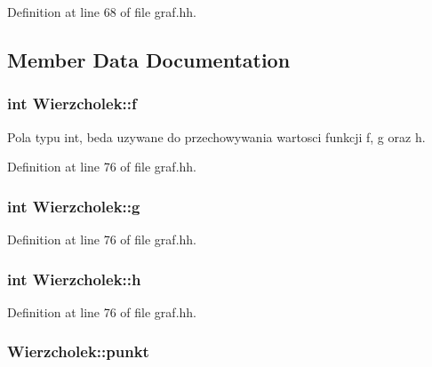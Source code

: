 Definition at line 68 of file graf.\-hh.



\subsection{Member Data Documentation}
\hypertarget{struct_wierzcholek_a013cad942d610c41b4cbea903ff8d9a5}{
\subsubsection[{f}]{\setlength{\rightskip}{0pt plus 5cm}int Wierzcholek\-::f}}\label{struct_wierzcholek_a013cad942d610c41b4cbea903ff8d9a5}


Pola typu int, beda uzywane do przechowywania wartosci funkcji f, g oraz h. 



Definition at line 76 of file graf.\-hh.

\hypertarget{struct_wierzcholek_a040d7401732673a65daf8cdbdaa7e2c1}{
\subsubsection[{g}]{\setlength{\rightskip}{0pt plus 5cm}int Wierzcholek\-::g}}\label{struct_wierzcholek_a040d7401732673a65daf8cdbdaa7e2c1}


Definition at line 76 of file graf.\-hh.

\hypertarget{struct_wierzcholek_ac7bb6b2e9a5254904bc67b33b76d34e4}{
\subsubsection[{h}]{\setlength{\rightskip}{0pt plus 5cm}int Wierzcholek\-::h}}\label{struct_wierzcholek_ac7bb6b2e9a5254904bc67b33b76d34e4}


Definition at line 76 of file graf.\-hh.

\hypertarget{struct_wierzcholek_a1518a0baa5657789e074463d16728c52}{
\subsubsection[{punkt}]{ Wierzcholek\-::punkt}}\label{struct_wierzcholek_a1518a0baa5657789e074463d16728c52}


